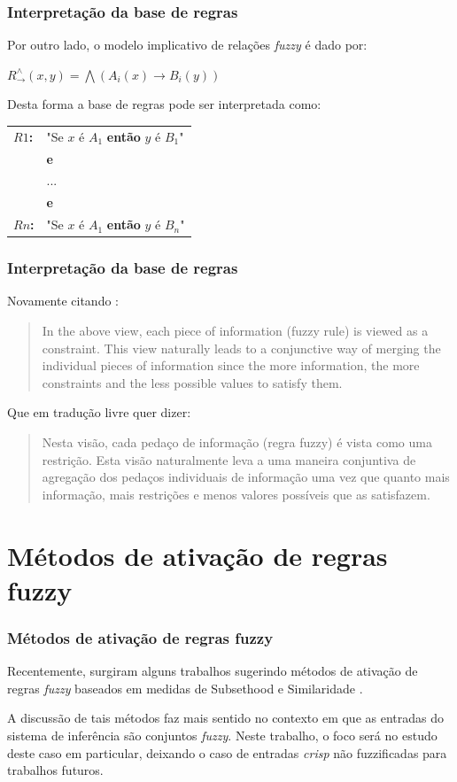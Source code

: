 \documentclass{beamer}
\theoremstyle{definition}
\begin{document}
\begin{frame}
\frametitle{Interpretação da base de regras}
Por outro lado, o modelo implicativo de relações \textit{fuzzy} é dado por:
\begin{center}
$R^{\wedge}_{\rightarrow}(x,y) = \bigwedge (A_{i}(x) \rightarrow B_{i}(y))$
\end{center}
Desta forma a base de regras pode ser interpretada como:
\begin{table}[H]
\centering
\label{base-de-regras-implicativo}
\begin{tabular}{ll}
\textbf{$R1$:}      & "Se $x$ é $A_{1}$ \textbf{então} $y$ é $B_{1}$" \\
      & \textbf{e}                 \\
      & ...                 \\
      & \textbf{e}                 \\     
\textbf{$Rn$:} & "Se $x$ é $A_{1}$ \textbf{então} $y$ é $B_{n}$"                
\end{tabular}
\end{table}
\end{frame}

\begin{frame}
\frametitle{Interpretação da base de regras}
Novamente citando \cite{p4}:
\begin{quote}
In the above view, each piece of information (fuzzy rule) is viewed as a constraint. This view naturally leads to a conjunctive way of merging the individual pieces of information since the more information, the more constraints and the less possible values to satisfy them.
\end{quote}
Que em tradução livre quer dizer:
\begin{quote}
Nesta visão, cada pedaço de informação (regra fuzzy) é vista como uma restrição. Esta visão naturalmente leva a uma maneira conjuntiva de agregação dos pedaços individuais de informação uma vez que quanto mais informação, mais restrições e menos valores possíveis que as satisfazem.
\end{quote}
\end{frame}

\section{Métodos de ativação de regras fuzzy}

\begin{frame}
\frametitle{Métodos de ativação de regras fuzzy}
Recentemente, surgiram alguns trabalhos sugerindo métodos de ativação de regras \textit{fuzzy} baseados em medidas de Subsethood e Similaridade \cite{p10} \cite{p11} \cite{p8} \cite{p9}.\par
A discussão de tais métodos faz mais sentido no contexto em que as entradas do sistema de inferência são conjuntos \textit{fuzzy}. Neste trabalho, o foco será no estudo deste caso em particular, deixando o caso de entradas \textit{crisp} não fuzzificadas para trabalhos futuros.\par
\end{frame}
\end{document}
